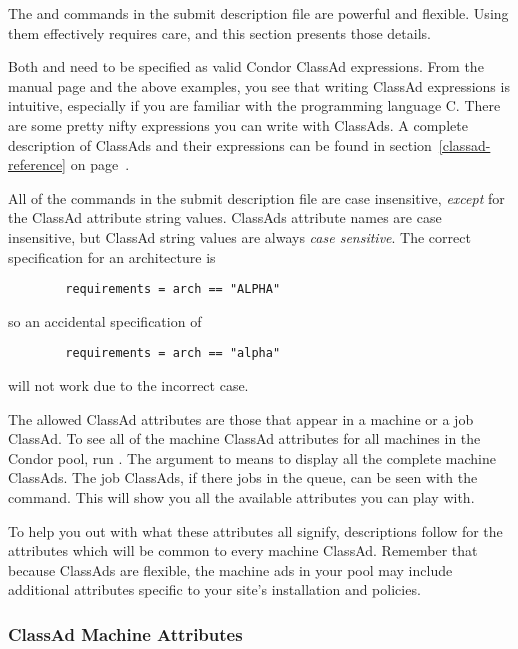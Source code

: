 The 
 and  commands in the submit description file
are powerful and flexible. 
Using them effectively requires care, and this section presents
those details.

Both  and  need to be specified 
as valid Condor ClassAd expressions.
From the  manual page and the above examples, you see
that writing ClassAd expressions is intuitive, especially if you
are familiar with the programming language C.  There are some
pretty nifty expressions you can write with ClassAds.
A complete description of ClassAds and their expressions
can be found in section~\ref{classad-reference} on 
page~\pageref{classad-reference}.

All of the commands in the submit description file are case insensitive, 
\emph{except} for the ClassAd attribute string values.
ClassAds attribute names are
case insensitive, but ClassAd string
values are always \emph{case sensitive}.
The correct specification for an architecture is
\begin{verbatim}
        requirements = arch == "ALPHA"
\end{verbatim}
so an accidental specification of
\begin{verbatim}
        requirements = arch == "alpha"
\end{verbatim}
will not work due to the incorrect case.

The allowed
ClassAd attributes are those 
that appear in a machine or a job ClassAd.
To see all of the machine ClassAd attributes for all machines in
the Condor pool, run .  
The  argument to
 means to display all the complete machine ClassAds.
The job ClassAds, if there jobs in the queue, can be seen
with the  command.
This
will show you all the available attributes you can play with.

To help you out with what these attributes all signify,
descriptions follow for the attributes which will be common to every
machine ClassAd. Remember that because ClassAds are flexible, the
machine ads in your pool may include additional attributes specific
to your site's installation and policies. 
\subsubsection{\label{user-man-machad}ClassAd Machine Attributes}

